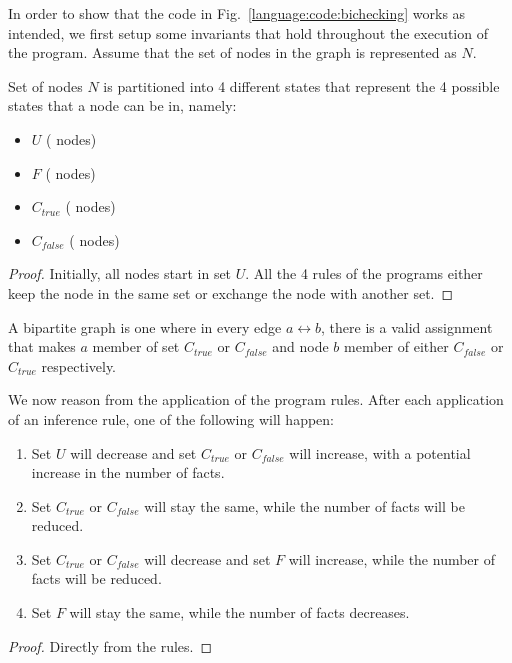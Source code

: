 In order to show that the code in Fig.~\ref{language:code:bichecking} works as
intended, we first setup some invariants that hold throughout the execution of
the program. Assume that the set of nodes in the graph is represented as $N$.

\begin{invariant}
Set of nodes $N$ is partitioned into 4 different states that represent the 4
possible states that a node can be in, namely:

\begin{itemize}
   \item $U$ ( nodes)
   \item $F$ ( nodes)
   \item $C_{true}$ ( nodes)
   \item $C_{false}$ ( nodes)
\end{itemize}
\end{invariant}
\begin{proof}
Initially, all nodes start in set $U$. All the 4 rules of the programs either
keep the node in the same set or exchange the node with another set.
\end{proof}

A bipartite graph is one where in every edge $a \leftrightarrow b$, there is a
valid assignment that makes $a$ member of set $C_{true}$ or $C_{false}$ and node
$b$ member of either $C_{false}$ or $C_{true}$ respectively.

\begin{variant}\label{language:lemma:bipartite_convergence}
   We now reason from the application of the program rules. After each
   application of an inference rule, one of the following will happen:

   \begin{enumerate}
      \item Set $U$ will decrease and set $C_{true}$ or $C_{false}$ will
         increase, with a potential increase in the number of 
         facts.
      \item Set $C_{true}$ or $C_{false}$ will stay the same, while the number
         of  facts will be reduced.

      \item Set $C_{true}$ or $C_{false}$ will decrease and set $F$ will
         increase, while the number of  facts will be reduced.

      \item Set $F$ will stay the same, while the number of  facts
         decreases.
   \end{enumerate}

\end{variant}
\begin{proof}
Directly from the rules.
\end{proof}

